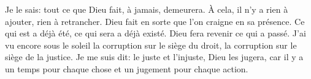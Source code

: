 Je le sais: tout ce que Dieu fait, à jamais, demeurera.
	À cela, il n’y a rien à ajouter, rien à retrancher.
Dieu fait en sorte que l’on craigne en sa présence.
Ce qui est a déjà été, ce qui sera a déjà existé.
	Dieu fera revenir ce qui a passé.
J’ai vu encore sous le soleil la corruption sur le siège du droit,
	la corruption sur le siège de la justice.
Je me suis dit: le juste et l’injuste, Dieu les jugera,
	car il y a un temps pour chaque chose et un jugement pour chaque action.